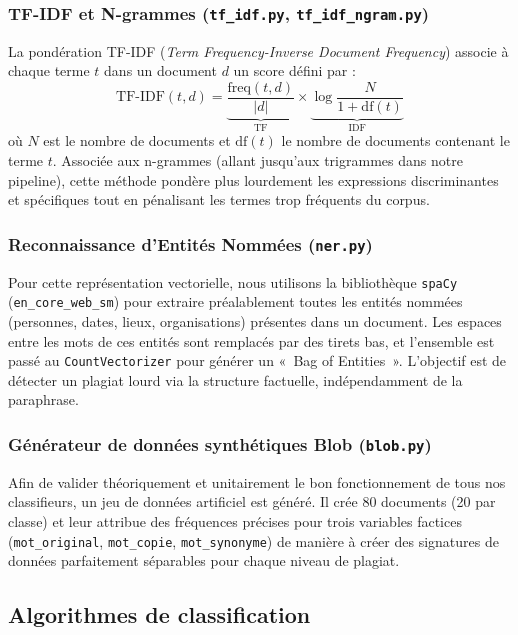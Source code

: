 \documentclass[12pt,a4paper]{article}
\begin{document}
\subsubsection{TF-IDF et N-grammes (\texttt{tf\_idf.py}, \texttt{tf\_idf\_ngram.py})}
La pondération TF-IDF (\textit{Term Frequency-Inverse Document Frequency}) associe à chaque terme $t$ dans un document $d$ un score défini par :
$$
\text{TF-IDF}(t,d) = \underbrace{\frac{\text{freq}(t,d)}{|d|}}_{\text{TF}} \times \underbrace{\log\frac{N}{1+\text{df}(t)}}_{\text{IDF}}
$$
où $N$ est le nombre de documents et $\text{df}(t)$ le nombre de documents contenant le terme $t$. Associée aux n-grammes (allant jusqu'aux trigrammes dans notre pipeline), cette méthode pondère plus lourdement les expressions discriminantes et spécifiques tout en pénalisant les termes trop fréquents du corpus.

\subsubsection{Reconnaissance d'Entités Nommées (\texttt{ner.py})}
Pour cette représentation vectorielle, nous utilisons la bibliothèque \texttt{spaCy} (\texttt{en\_core\_web\_sm}) pour extraire préalablement toutes les entités nommées (personnes, dates, lieux, organisations) présentes dans un document. Les espaces entre les mots de ces entités sont remplacés par des tirets bas, et l'ensemble est passé au \texttt{CountVectorizer} pour générer un «~Bag of Entities~». L'objectif est de détecter un plagiat lourd via la structure factuelle, indépendamment de la paraphrase.

\subsubsection{Générateur de données synthétiques Blob (\texttt{blob.py})}
Afin de valider théoriquement et unitairement le bon fonctionnement de tous nos classifieurs, un jeu de données artificiel est généré. Il crée 80 documents (20 par classe) et leur attribue des fréquences précises pour trois variables factices (\texttt{mot\_original}, \texttt{mot\_copie}, \texttt{mot\_synonyme}) de manière à créer des signatures de données parfaitement séparables pour chaque niveau de plagiat.

\subsection{Algorithmes de classification}
\end{document}
